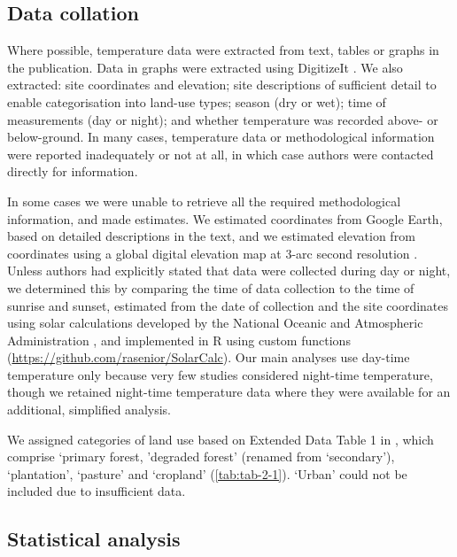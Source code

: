 \documentclass[12pt,a4paper,]{report}
\theoremstyle{definition}
\theoremstyle{definition}
\theoremstyle{definition}
\theoremstyle{remark}
\begin{document}
\subsection{Data collation}\label{data-collation}

Where possible, temperature data were extracted from text, tables or
graphs in the publication. Data in graphs were extracted using
DigitizeIt \citep[www.digitizeit.de;][]{scheffers_microhabitats_2014}.
We also extracted: site coordinates and elevation; site descriptions of
sufficient detail to enable categorisation into land-use types; season
(dry or wet); time of measurements (day or night); and whether
temperature was recorded above- or below-ground. In many cases,
temperature data or methodological information were reported
inadequately or not at all, in which case authors were contacted
directly for information.

In some cases we were unable to retrieve all the required methodological
information, and made estimates. We estimated coordinates from Google
Earth, based on detailed descriptions in the text, and we estimated
elevation from coordinates using a global digital elevation map at 3-arc
second resolution \citep{nasa_srtm_2008}. Unless authors had explicitly
stated that data were collected during day or night, we determined this
by comparing the time of data collection to the time of sunrise and
sunset, estimated from the date of collection and the site coordinates
using solar calculations developed by the National Oceanic and
Atmospheric Administration \citep{noaa_solar}, and implemented in R
using custom functions (\url{https://github.com/rasenior/SolarCalc}).
Our main analyses use day-time temperature only because very few studies
considered night-time temperature, though we retained night-time
temperature data where they were available for an additional, simplified
analysis.

We assigned categories of land use based on Extended Data Table 1 in
\citet{newbold_global_2015}, which comprise `primary forest, 'degraded
forest' (renamed from `secondary'), `plantation', `pasture' and
`cropland' (\autoref{tab:tab-2-1}). `Urban' could not be included due to
insufficient data.

\subsection{Statistical analysis}\label{statistical-analysis}
\end{document}
